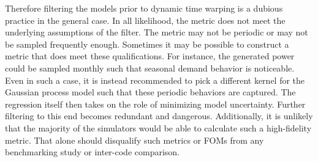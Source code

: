 Therefore filtering the models prior to dynamic time warping is a dubious practice
in the general case. In all likelihood, the metric does not meet the underlying 
assumptions of the filter. The metric may not be periodic or may not be sampled 
frequently enough. Sometimes it may be possible to construct a metric that does
meet these qualifications. For instance, the generated power could be sampled monthly  
such that seasonal demand behavior is noticeable. Even in such a case, it is instead recommended
to pick a different kernel for the Gaussian process model such that these 
periodic behaviors are captured.  The regression itself then takes on the role of 
minimizing model uncertainty. Further filtering to this end becomes redundant and
dangerous.  Additionally, it is unlikely that 
the majority of the simulators would be able to calculate such a high-fidelity metric.
That alone should disqualify such metrics or FOMs from any benchmarking study or
inter-code comparison.
